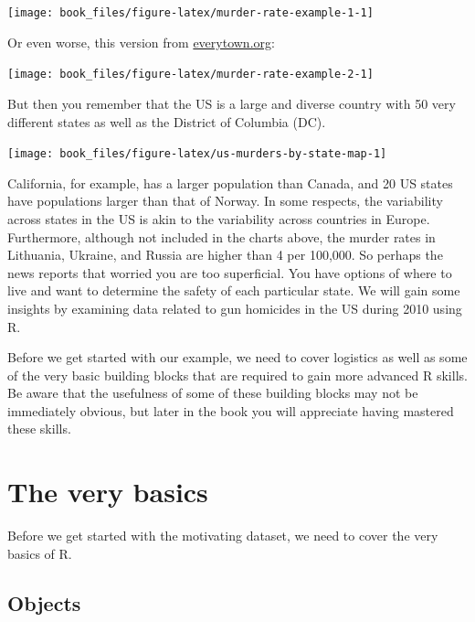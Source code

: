 \documentclass[
]{krantz}
\begin{document}
\begin{center}\texttt{[image: book\_files/figure-latex/murder-rate-example-1-1]} \end{center}

Or even worse, this version from \href{https://everytownresearch.org}{everytown.org}:

\begin{center}\texttt{[image: book\_files/figure-latex/murder-rate-example-2-1]} \end{center}

But then you remember that the US is a large and diverse country with 50 very different states as well as the District of Columbia (DC).

\begin{center}\texttt{[image: book\_files/figure-latex/us-murders-by-state-map-1]} \end{center}

California, for example, has a larger population than Canada, and 20 US states have populations larger than that of Norway. In some respects, the variability across states in the US is akin to the variability across countries in Europe. Furthermore, although not included in the charts above, the murder rates in Lithuania, Ukraine, and Russia are higher than 4 per 100,000. So perhaps the news reports that worried you are too superficial. You have options of where to live and want to determine the safety of each particular state. We will gain some insights by examining data related to gun homicides in the US during 2010 using R.

Before we get started with our example, we need to cover logistics as well as some of the very basic building blocks that are required to gain more advanced R skills. Be aware that the usefulness of some of these building blocks may not be immediately obvious, but later in the book you will appreciate having mastered these skills.

\hypertarget{the-very-basics}{%
\section{The very basics}\label{the-very-basics}}

Before we get started with the motivating dataset, we need to cover the very basics of R.

\hypertarget{objects}{%
\subsection{Objects}\label{objects}}
\end{document}
